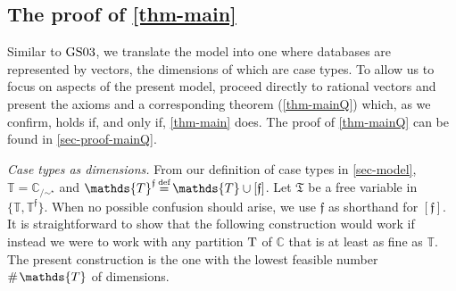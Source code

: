\documentclass[ecta,nameyear,draft]{econsocart}
\makeatletter
\newcommand{\reg}{\operatorname{reg}}
\newcommand{\countof}{\mathbin{\#}\hskip1pt}
\newcommand{\mbb}{\mathbb}
\newcommand{\mc}{\mathcal}
\newcommand\defeq{\mathrel{\overset{\makebox[0pt]{\mbox{\normalfont\tiny def}}}{=}}}%
\newcommand{\novel}{\mathfrak f}
\newcommand{\nnint}{{\mbb Z}_{\mplus}}
\newcommand\mplus{\text{\srcsize$+$}}
\newcommand{\preceqb}{\mathbin{\preceq}}
\newcommand{\ext}{\mathrel{\mc R}}
\newcommand{\supext}{{\ext}}
\newcommand{\mbbd}{{\mathds D}}
\newcommand{\mbbc}{{\mathds C}}
\newcommand{\mbbt}{{\mathds {T}}}
\newcommand{\mbbtp}{{\mathds{T}^\novel}}
\newcommand{\mbbtpp}{{\mathfrak{T}}}
\newcommand{\mbbi}{{\mathds L}}
\newcommand{\mbbip}{{\mathds{L}^{\novel}}}
\newcommand{\srcsize}{\@setfontsize{\srcsize}{3pt}{3pt}}
\newcommand{\gsii}{$\textup{GS03}$}
\theoremstyle{plain}
\theoremstyle{remark}
\makeatother
\begin{document}
\makeatletter
\def\@seccntformat#1{Appendix\,\csname the#1\endcsname.\quad}
\makeatother
\begin{appendix}
  \section{The proof of \cref{thm-main}}\label{sec-proof-main}




  Similar to \gsii, we  translate the model into one where databases are
  represented by vectors, the dimensions of which are case types. To allow us
  to focus on aspects of the present model,  proceed directly to rational
  vectors and present the axioms  and a corresponding theorem
  (\cref{thm-mainQ}) which, as we confirm, holds if, and only if, 
  \cref{thm-main} does. The proof of \cref{thm-mainQ} can be found in
  \cref{sec-proof-mainQ}.


  \emph{Case types as dimensions.} From our definition
  of case types in  \cref{sec-model}, $\mbbt = \mbbc_{/\sim^{\star}}$ and
  $\mbbt^\novel \defeq \mbbt\cup [ \novel ]$. Let $\mbbtpp$ be a free variable
  in $\{\mbbt , \mbbtp \}$.  When no possible confusion should arise, we use
  $\novel$ as shorthand for $[ \novel ]$.  It is straightforward to show that
  the following construction would work if instead we were to work with any
  partition $\textup T$ of $\mbbc$ that is at least as fine as $\mbbt$.
  The present construction is the one with the lowest feasible number
  $\countof \mbbt$ of dimensions.



\end{appendix}
\end{document}
